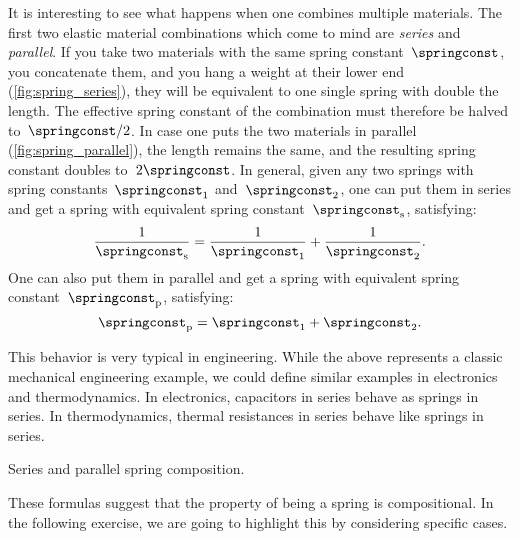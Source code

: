     It is interesting to see what happens when one combines multiple materials.
    The first two elastic material combinations which come to mind are \emph{series} and \emph{parallel}.
    If you take two materials with the same spring constant~$\springconst$, you concatenate them, and you hang a weight at their lower end (\cref{fig:spring_series}), they will be equivalent to one single spring with double the length.
    The effective spring constant of the combination must therefore be halved to~$\springconst/2$.
    In case one puts the two materials in parallel (\cref{fig:spring_parallel}), the length remains the same, and the resulting spring constant doubles to~$2\springconst$.
    In general, given any two springs with spring constants~$\springconst_1$ and~$\springconst_2$, one can put them in series and get a spring with equivalent spring constant~$\springconst_{\mathrm{s}}$, satisfying:
    \begin{equation}
        \frac{1}{\springconst_\mathrm{s}}=\frac{1}{\springconst_1}+\frac{1}{\springconst_2}.
    \end{equation}
    One can also put them in parallel and get a spring with equivalent spring constant~$\springconst_\mathrm{p}$, satisfying:
\begin{equation}
    \springconst_\mathrm{p}=\springconst_1+\springconst_2.
\end{equation}

\begin{remark}
    This behavior is very typical in engineering.
    While the above represents a classic mechanical engineering example, we could define similar examples in electronics and thermodynamics.
    In electronics, capacitors in series behave as springs in series.
    In thermodynamics, thermal resistances in series behave like springs in series.
\end{remark}

\begin{marginfigure}
    \centering
    \hspace{1cm}
    \caption{Series and parallel spring composition.}
    \label{fig:springs}
\end{marginfigure}

These formulas suggest that the property of being a spring is compositional.
In the following exercise, we are going to highlight this by considering specific cases.

